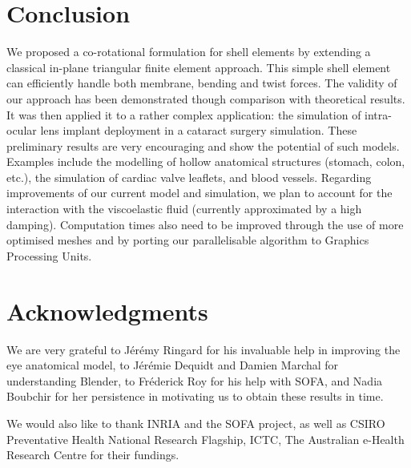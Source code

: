 \documentclass{llncs}
\begin{document}
\section{Conclusion}

We proposed a co-rotational formulation for shell elements by extending a classical in-plane triangular finite element approach. This simple shell element can efficiently handle both membrane, bending and twist forces. The validity of our approach has been demonstrated though comparison with theoretical results. It was then applied it to a rather complex application: the simulation of intra-ocular lens implant deployment in a cataract surgery simulation. These preliminary results are very encouraging and show the potential of such models. Examples include the modelling of hollow anatomical structures (stomach, colon, etc.), the simulation of cardiac valve leaflets, and blood vessels. Regarding improvements of our current model and simulation, we plan to account for the interaction with the viscoelastic fluid (currently approximated by a high damping). Computation times also need to be improved through the use of more optimised meshes and by porting our parallelisable algorithm to Graphics Processing Units. 

\section*{Acknowledgments}
We are very grateful to J\'er\'emy Ringard for his invaluable help in improving the eye anatomical model, to J\'er\'emie Dequidt and Damien Marchal for understanding Blender, to Fr\'ederick Roy for his help with SOFA, and Nadia Boubchir for her persistence in motivating us to obtain these results in time. 

\bigskip

We would also like to thank INRIA and the SOFA project, as well as CSIRO Preventative Health National Research Flagship, ICTC, The Australian e-Health Research Centre for their fundings. 



\end{document}
